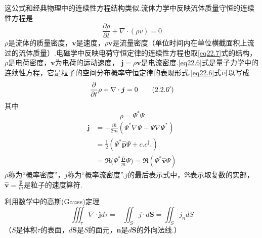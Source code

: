 这公式和经典物理中的连续性方程结构类似.流体力学中反映流体质量守恒的连续性方程是
\begin{equation}\label{eq22.7}
	\frac{\partial \rho}{\partial t}+\nabla\cdot(\rho v)=0
\end{equation}
$\rho$是流体的质量密度，$\boldsymbol{v}$是速度，$\rho\boldsymbol{v}$是流量密度（单位时间内在单位横截面积上流过的流体质量）.电磁学中反映电荷守恒定律的连续性方程也取\eqref{eq22.7}式的结构，$\rho$是电荷密度，$\boldsymbol{v}$为电荷的运动速度， $\boldsymbol{j}=\rho\boldsymbol{v}$是电流密度.\eqref{eq22.6}式是量子力学中的连续性方程，它是粒子的空间分布概率守恒定律的表现形式.\eqref{eq22.6}式可以写成
\begin{equation*} \label{eq22.6'}
	\frac{\partial}{\partial t}\rho+\nabla\cdot\boldsymbol{j}=0 \tag{$2.2.6^{\prime}$}
\end{equation*}
其中
\begin{equation}\label{eq22.8}
	\rho=\varPsi^{*}\varPsi
\end{equation}\eqnormal
\begin{equation} \label{eq22.9}
	\begin{aligned}
		\boldsymbol{j}
			&=-\frac{i\hbar}{2m}(\varPsi^{*}\nabla\varPsi-\varPsi\nabla\varPsi^{*}) \\
			&=\frac{1}{2}(\varPsi^{*}\hat{\boldsymbol{p}}\varPsi+c.c^{\ddag}.) \\
			&=\Re\bigg(\varPsi^{*}\frac{\hat{\boldsymbol{p}}}{m}\varPsi \bigg)
			 =\Re(\varPsi^{*}\hat{\boldsymbol{v}}\varPsi)
	\end{aligned}
\end{equation}
$\rho$称为“概率密度”，$j$称为“概率流密度”.$j$的最后表示式中，$\Re$表示取复数的实部，$\hat{\boldsymbol{v}}=\frac{\hat{\boldsymbol{p}}}{m}$是粒子的速度算符.

利用数学中的高斯(Gauss)定理
\begin{equation*}
	\iiint_{\tau}\nabla\cdot \boldsymbol{j}d\tau
	=-\iint_{S}j\cdot d\boldsymbol{S}=\iint_{S}j_{n}dS
\end{equation*}
（$S$是体积$\tau$的表面，$d\boldsymbol{S}$是$S$的面元，$\boldsymbol{n}$是$d\boldsymbol{S}$的外向法线.）

